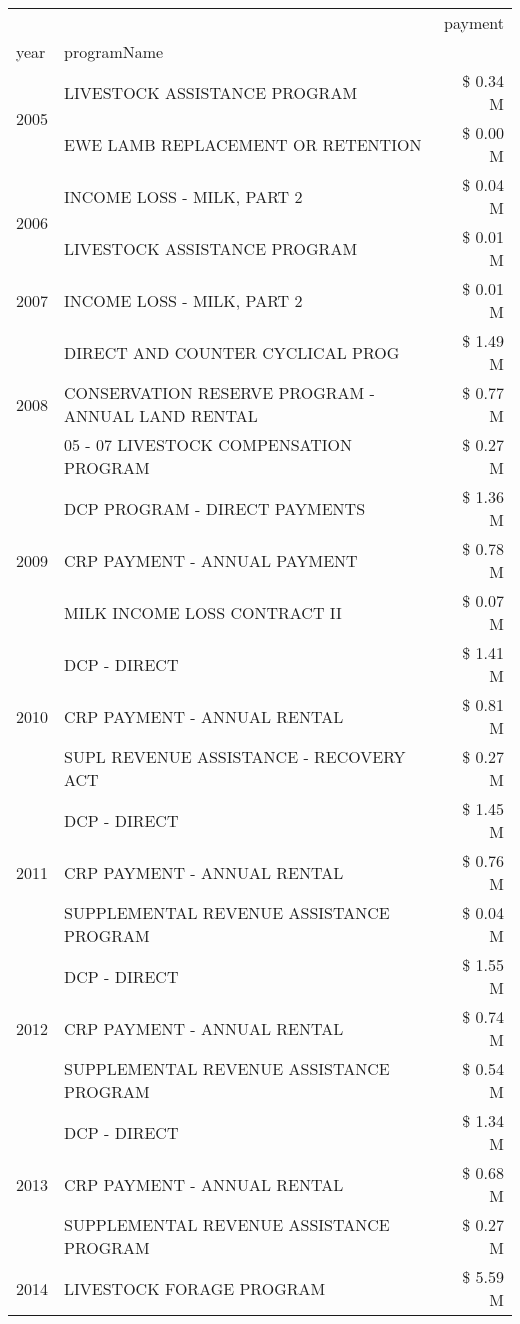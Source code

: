 \begin{tabular}{llr}
\toprule
 &  & payment \\
year & programName &  \\
\midrule
\multirow[t]{2}{*}{2005} & LIVESTOCK ASSISTANCE PROGRAM & \$ 0.34 M \\
 & EWE LAMB REPLACEMENT OR RETENTION & \$ 0.00 M \\
\cline{1-3}
\multirow[t]{2}{*}{2006} & INCOME LOSS - MILK, PART 2 & \$ 0.04 M \\
 & LIVESTOCK ASSISTANCE PROGRAM & \$ 0.01 M \\
\cline{1-3}
2007 & INCOME LOSS - MILK, PART 2 & \$ 0.01 M \\
\cline{1-3}
\multirow[t]{3}{*}{2008} & DIRECT AND COUNTER CYCLICAL PROG & \$ 1.49 M \\
 & CONSERVATION RESERVE PROGRAM - ANNUAL LAND RENTAL & \$ 0.77 M \\
 & 05 - 07 LIVESTOCK COMPENSATION PROGRAM & \$ 0.27 M \\
\cline{1-3}
\multirow[t]{3}{*}{2009} & DCP PROGRAM - DIRECT PAYMENTS & \$ 1.36 M \\
 & CRP PAYMENT - ANNUAL PAYMENT & \$ 0.78 M \\
 & MILK INCOME LOSS CONTRACT II & \$ 0.07 M \\
\cline{1-3}
\multirow[t]{3}{*}{2010} & DCP - DIRECT & \$ 1.41 M \\
 & CRP PAYMENT - ANNUAL RENTAL & \$ 0.81 M \\
 & SUPL REVENUE ASSISTANCE - RECOVERY ACT & \$ 0.27 M \\
\cline{1-3}
\multirow[t]{3}{*}{2011} & DCP - DIRECT & \$ 1.45 M \\
 & CRP PAYMENT - ANNUAL RENTAL & \$ 0.76 M \\
 & SUPPLEMENTAL REVENUE ASSISTANCE PROGRAM & \$ 0.04 M \\
\cline{1-3}
\multirow[t]{3}{*}{2012} & DCP - DIRECT & \$ 1.55 M \\
 & CRP PAYMENT - ANNUAL RENTAL & \$ 0.74 M \\
 & SUPPLEMENTAL REVENUE ASSISTANCE PROGRAM & \$ 0.54 M \\
\cline{1-3}
\multirow[t]{3}{*}{2013} & DCP - DIRECT & \$ 1.34 M \\
 & CRP PAYMENT - ANNUAL RENTAL & \$ 0.68 M \\
 & SUPPLEMENTAL REVENUE ASSISTANCE PROGRAM & \$ 0.27 M \\
\cline{1-3}
\multirow[t]{3}{*}{2014} & LIVESTOCK FORAGE PROGRAM & \$ 5.59 M \\

\end{tabular}
